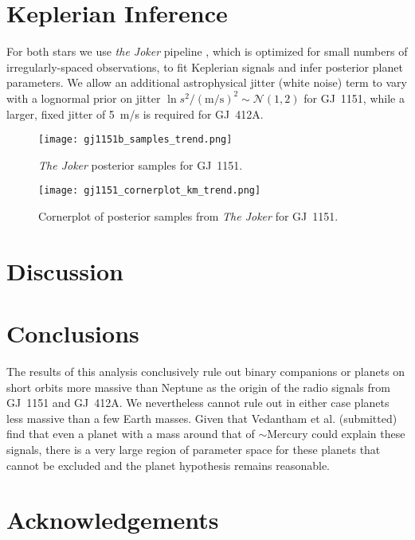 \documentclass[modern]{aastex62}
\begin{document}
\section{Keplerian Inference}
\label{sec:joker}

For both stars we use \textit{the Joker} pipeline \citep{joker}, which is optimized for small numbers of irregularly-spaced observations, to fit Keplerian signals and infer posterior planet parameters. We allow an additional astrophysical jitter (white noise) term to vary with a lognormal prior on jitter $\ln {s^2/(\text{m/s})^2} \sim \mathscr{N}(1,2)$ for GJ~1151, while a larger, fixed jitter of 5~m/s is required for GJ~412A.

\begin{figure}
\noindent\texttt{[image: gj1151b\_samples\_trend.png]}

\caption{\label{jokermodel}
\textit{The Joker} posterior samples for GJ~1151.
}
\end{figure}

\begin{figure}
\noindent\texttt{[image: gj1151\_cornerplot\_km\_trend.png]}

\caption{\label{cornerplot}
Cornerplot of posterior samples from \textit{The Joker} for GJ~1151.
}
\end{figure}

\section{Discussion}
\label{sec:discussion}

\section{Conclusions}
\label{sec:conclusions}

The results of this analysis conclusively rule out binary companions or planets on short orbits more massive than Neptune as the origin of the radio signals from GJ~1151 and GJ~412A. We nevertheless cannot rule out in either case planets less massive than a few Earth masses. Given that Vedantham et al. (submitted) find that even a planet with a mass around that of $\sim$Mercury could explain these signals, there is a very large region of parameter space for these planets that cannot be excluded and the planet hypothesis remains reasonable. 

\section*{Acknowledgements} %
\end{document}
